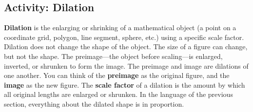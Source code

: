\subsection{Activity: Dilation}
\textbf{Dilation} is the enlarging or shrinking of a mathematical object (a point on a coordinate grid, polygon, line segment, sphere, etc.) using a specific scale factor. Dilation does not change the shape of the object. The size of a figure can change, but not the shape. The preimage---the object before scaling---is enlarged, inverted, or shrunken to form the image. The preimage and image are dilations of one another. You can think of the \textbf{preimage} as the original figure, and the \textbf{image} as the new figure. The \textbf{scale factor} of a dilation is the amount by which all original lengths are enlarged or shrunken. In the language of the previous section, everything about the dilated shape is in proportion.
